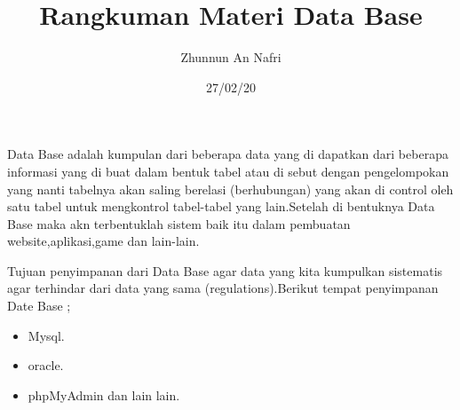 \documentclass[12pt]{article}
\title{Rangkuman Materi Data Base}
\author{Zhunnun An Nafri}
\date{27/02/20}
\begin{document}
\maketitle

Data Base adalah kumpulan dari beberapa data yang di dapatkan dari beberapa informasi yang di buat dalam bentuk tabel atau di sebut dengan pengelompokan yang nanti tabelnya akan saling berelasi (berhubungan) yang akan di control oleh satu tabel untuk mengkontrol tabel-tabel yang lain.Setelah di bentuknya Data Base maka akn terbentuklah sistem baik itu dalam pembuatan website,aplikasi,game dan lain-lain. 

Tujuan penyimpanan dari Data Base agar data yang kita kumpulkan sistematis agar terhindar dari data yang sama (regulations).Berikut tempat penyimpanan Date Base ;

\begin{itemize}
  \item Mysql.
  \item oracle.
  \item phpMyAdmin dan lain lain.
  
  
\end{itemize}
\end{document}
